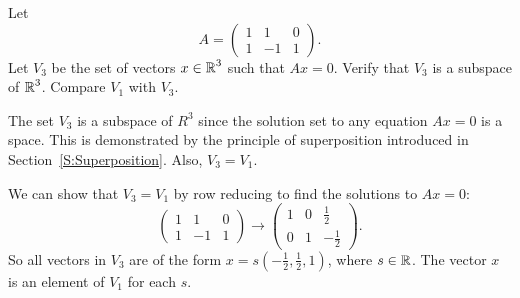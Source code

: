 \documentclass{ximera}
\begin{document}
\begin{exercise} \label{c5.1.3}
Let
\[
A=\left(\begin{array}{rrr} 1 & 1 & 0\\ 1 & -1 & 1 \end{array}
\right).
\]
Let $V_3$ be the set of vectors $x\in\mbox{$\Bbb{R}$}^3$ such that $Ax=0$.
Verify that $V_3$ is a subspace of $\mbox{$\Bbb{R}$}^3$.  Compare $V_1$ with
$V_3$.

\begin{solution}

The set $V_3$ is a subspace of $R^3$ since the solution set to
any equation $Ax = 0$ is a space.  This is demonstrated by the
principle of superposition introduced in Section~\ref{S:Superposition}.
Also, $V_3 = V_1$.  

\para We can show that $V_3 = V_1$ by row reducing to find the
solutions to $Ax = 0$:
\[
\left(\begin{array}{rrr} 1 & 1 & 0 \\ 1 & -1 & 1
\end{array}\right) \longrightarrow \left(\begin{array}{rrr} 1 & 0 &
\frac{1}{2} \\ 0 & 1 & -\frac{1}{2} \end{array}\right).
\]
So all vectors in $V_3$ are of the form $x = s(-\frac{1}{2},
\frac{1}{2}, 1)$, where $s \in \mbox{$\Bbb{R}$}$.  The vector $x$ is an element
of $V_1$ for each $s$.


\end{solution}
\end{exercise}
\end{document}
